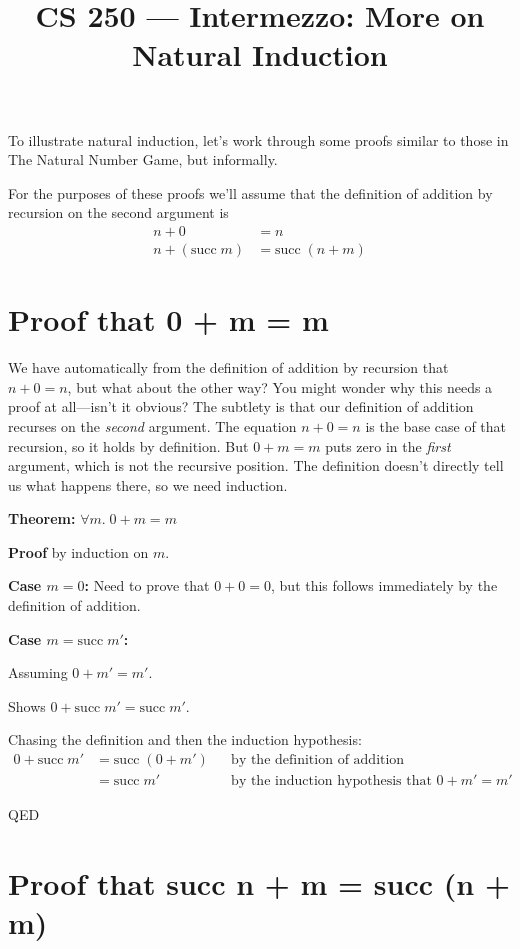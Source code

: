 \documentclass[11pt]{article}
\title{CS 250 --- Intermezzo: More on Natural Induction}
\author{}
\date{}
\begin{document}
\maketitle

To illustrate natural induction, let's work through some proofs similar to those in The Natural Number Game, but informally.

For the purposes of these proofs we'll assume that the definition of addition by recursion on the second argument is
\begin{align*}
n + 0 &= n \\
n + (\text{succ}\; m) &= \text{succ}\;(n + m)
\end{align*}

\section{Proof that 0 + m = m}
We have automatically from the definition of addition by recursion that $n + 0 = n$, but what about the other way? You might wonder why this needs a proof at all---isn't it obvious? The subtlety is that our definition of addition recurses on the \emph{second} argument. The equation $n + 0 = n$ is the base case of that recursion, so it holds by definition. But $0 + m = m$ puts zero in the \emph{first} argument, which is not the recursive position. The definition doesn't directly tell us what happens there, so we need induction.

\textbf{Theorem:} $\forall m.\; 0 + m = m$

\textbf{Proof} by induction on $m$.

\textbf{Case $m = 0$:} Need to prove that $0 + 0 = 0$, but this follows immediately by the definition of addition.

\textbf{Case $m = \text{succ}\; m'$:}

Assuming $0 + m' = m'$.

Shows $0 + \text{succ}\; m' = \text{succ}\; m'$.

Chasing the definition and then the induction hypothesis:
\begin{align*}
0 + \text{succ}\; m'
  &= \text{succ}\;(0 + m') && \text{by the definition of addition} \\
  &= \text{succ}\; m' && \text{by the induction hypothesis that } 0 + m' = m'
\end{align*}

QED

\section{Proof that succ n + m = succ (n + m)}
\end{document}
